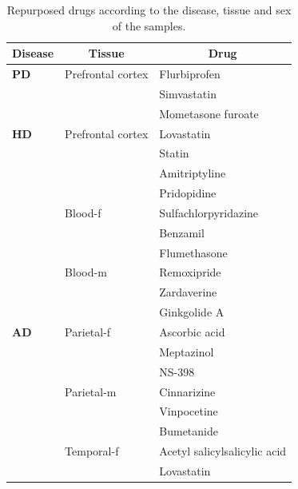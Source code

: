 \begin{table}[!ht]
\small
\centering
\caption{Repurposed drugs according to the disease, tissue and sex of the samples.}
\label{tab:drugs}
\begin{tabular}{l|ll}
\hline
\multicolumn{1}{c|}{\textbf{Disease}} & \multicolumn{1}{c}{\textbf{Tissue}} & \multicolumn{1}{c}{\textbf{Drug}} \\ \hline
\textbf{PD} & Prefrontal cortex & Flurbiprofen                 \\
            &                   & Simvastatin                  \\
            &                   & Mometasone furoate           \\ \hline
\textbf{HD} & Prefrontal cortex & Lovastatin                   \\
            &                   & Statin                       \\
            &                   & Amitriptyline                \\
            &                   & Pridopidine                  \\
            & Blood-f           & Sulfachlorpyridazine         \\
            &                   & Benzamil                     \\
            &                   & Flumethasone                 \\
            & Blood-m           & Remoxipride                  \\
            &                   & Zardaverine                  \\
            &                   & Ginkgolide A                 \\ \hline
\textbf{AD} & Parietal-f        & Ascorbic acid                \\
            &                   & Meptazinol                   \\
            &                   & NS-398                       \\
            & Parietal-m        & Cinnarizine                  \\
            &                   & Vinpocetine                  \\
            &                   & Bumetanide                   \\
            & Temporal-f        & Acetyl salicylsalicylic acid \\
            &                   & Lovastatin                   \\

\end{tabular}
\end{table}

